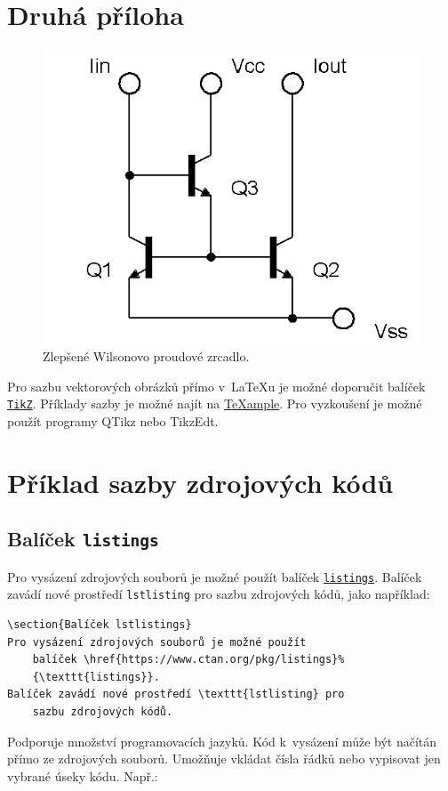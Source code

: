 \chapter{Druhá příloha}

\begin{figure}[!h]
  \begin{center}
    \includegraphics[scale=0.5]{obrazky/ZlepseneWilsonovoZrcadloNPN}
  \end{center}
  \caption[Alenčino zrcadlo]{Zlepšené Wilsonovo proudové zrcadlo.}
\end{figure}

Pro sazbu vektorových obrázků přímo v~\LaTeX{}u je možné doporučit balíček \href{https://www.ctan.org/pkg/pgf}{\texttt{TikZ}}.
Příklady sazby je možné najít na \href{http://www.texample.net/tikz/examples/}{\TeX{}ample}.
Pro vyzkoušení je možné použít programy QTikz nebo TikzEdt.




\chapter{Příklad sazby zdrojových kódů}

\section{Balíček \texttt{listings}}

Pro vysázení zdrojových souborů je možné použít balíček \href{https://www.ctan.org/pkg/listings}{\texttt{listings}}.
Balíček zavádí nové prostředí \texttt{lstlisting} pro sazbu zdrojových kódů, jako například:
%
\begin{lstlisting}[language={[LaTeX]TeX}]
\section{Balíček lstlistings}
Pro vysázení zdrojových souborů je možné použít
	balíček \href{https://www.ctan.org/pkg/listings}%
	{\texttt{listings}}.
Balíček zavádí nové prostředí \texttt{lstlisting} pro
	sazbu zdrojových kódů.
\end{lstlisting}
%
Podporuje množství programovacích jazyků.
Kód k~vysázení může být načítán přímo ze zdrojových souborů.
Umožňuje vkládat čísla řádků nebo vypisovat jen vybrané úseky kódu.
Např.:

